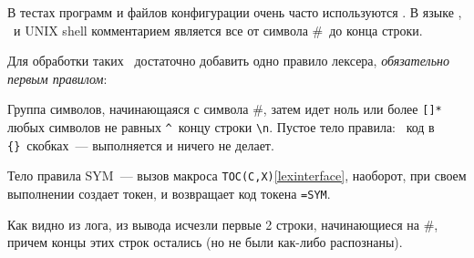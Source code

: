 \label{minicomment}

В тестах программ и файлов конфигурации очень часто используются
. В языке \py, \bi\ и UNIX shell комментарием является все
от символа \#\ до конца строки.

Для обработки таких \
достаточно добавить одно правило лексера, \emph{обязательно первым правилом}:


Группа символов, начинающаяся с символа \#, затем идет ноль или более \verb|[]*|
любых символов не равных \verb|^|\ концу строки \verb|\n|.
Пустое тело правила: \cpp\ код в \verb|{}|\ скобках\ --- выполняется и ничего не
делает.

Тело правила SYM\ --- вызов макроса \verb|TOC(C,X)|\ref{lexinterface}, наоборот,
при своем выполнении создает токен, и возвращает код токена \verb|=SYM|.


Как видно из лога, из вывода исчезли первые 2 строки, начинающиеся на \#, причем
концы этих строк остались (но не были как-либо распознаны).